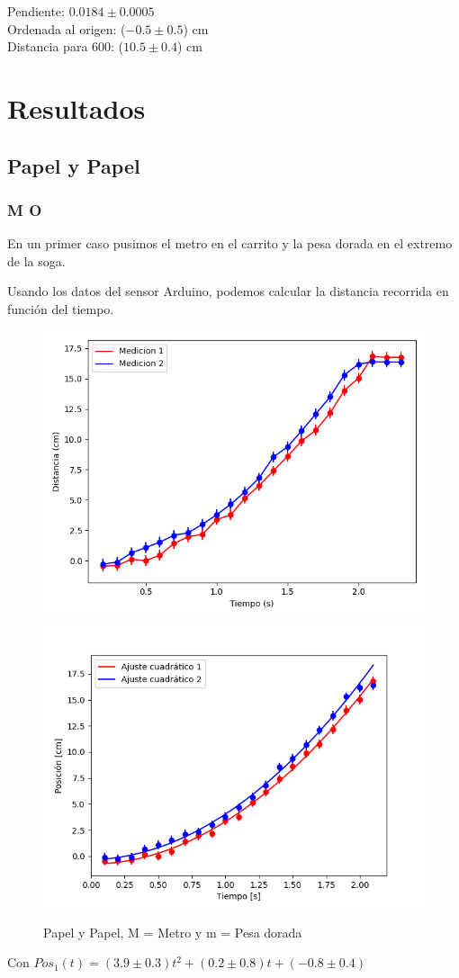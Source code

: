 \documentclass[12pt,a4]{article}
\begin{document}
Pendiente: $0.0184 \pm 0.0005$ \\

Ordenada al origen: ($-0.5 \pm 0.5$) cm\\

Distancia para 600: ($10.5 \pm 0.4$) cm \\

\section{Resultados}

\subsection{Papel y Papel}

\subsubsection{M O}

En un primer caso pusimos el metro en el carrito y la pesa dorada en el extremo de la soga.

Usando los datos del sensor Arduino, podemos calcular la distancia recorrida en función del tiempo.

\begin{figure}[H]
    \centering
    \includegraphics[width=0.4\linewidth]{TiempoVsDistanciaPapelPapelM_O.png}
    \includegraphics[width=0.4\linewidth]{ajuste2_PapelPapelM_O.png}
    \caption{Papel y Papel, M = Metro y m = Pesa dorada}
    \label{fig:PyPM_O}
\end{figure}

Con $Pos_1(t) = (3.9 \pm 0.3) t^2 + (0.2 \pm 0.8) t + (-0.8 \pm 0.4)$
\end{document}
